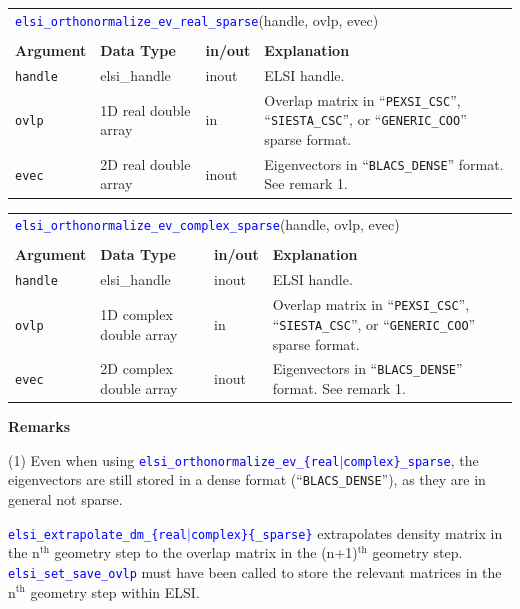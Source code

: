 \documentclass{report}
\newcommand{\api}[1]{\textcolor{blue}{\texttt{#1}}}
\begin{document}
\begin{tabular}[]{|p{20mm}|p{40mm}|p{10mm}|p{92mm}|}
\multicolumn{4}{l}{\api{elsi\_orthonormalize\_ev\_real\_sparse}(handle, ovlp, evec)}\\
\multicolumn{4}{l}{}\\
\hline
\multicolumn{1}{|l|}{\textbf{Argument}} & \multicolumn{1}{l|}{\textbf{Data Type}} & \multicolumn{1}{l|}{\textbf{in/out}} & \multicolumn{1}{l|}{\textbf{Explanation}}\\
\hline
\texttt{handle} & elsi\_handle         & inout & ELSI handle.\\
\hline
\texttt{ovlp}   & 1D real double array & in    & Overlap matrix in ``\texttt{PEXSI\_CSC}'', ``\texttt{SIESTA\_CSC}'', or ``\texttt{GENERIC\_COO}'' sparse format.\\
\hline
\texttt{evec}   & 2D real double array & inout & Eigenvectors in ``\texttt{BLACS\_DENSE}'' format. See remark 1.\\
\hline
\end{tabular}

\begin{tabular}[]{|p{20mm}|p{40mm}|p{10mm}|p{92mm}|}
\multicolumn{4}{l}{\api{elsi\_orthonormalize\_ev\_complex\_sparse}(handle, ovlp, evec)}\\
\multicolumn{4}{l}{}\\
\hline
\multicolumn{1}{|l|}{\textbf{Argument}} & \multicolumn{1}{l|}{\textbf{Data Type}} & \multicolumn{1}{l|}{\textbf{in/out}} & \multicolumn{1}{l|}{\textbf{Explanation}}\\
\hline
\texttt{handle} & elsi\_handle            & inout & ELSI handle.\\
\hline
\texttt{ovlp}   & 1D complex double array & in    & Overlap matrix in ``\texttt{PEXSI\_CSC}'', ``\texttt{SIESTA\_CSC}'', or ``\texttt{GENERIC\_COO}'' sparse format.\\
\hline
\texttt{evec}   & 2D complex double array & inout & Eigenvectors in ``\texttt{BLACS\_DENSE}'' format. See remark 1.\\
\hline
\end{tabular}

\textbf{Remarks}

(1) Even when using \api{elsi\_orthonormalize\_ev\_\{real$\vert$complex\}\_sparse}, the eigenvectors are still stored in a dense format (``\texttt{BLACS\_DENSE}''), as they are in general not sparse.

\api{elsi\_extrapolate\_dm\_\{real$\vert$complex\}\{\_sparse\}} extrapolates density matrix in the n$^\text{th}$ geometry step to the overlap matrix in the (n+1)$^\text{th}$ geometry step. \api{elsi\_set\_save\_ovlp} must have been called to store the relevant matrices in the n$^\text{th}$ geometry step within ELSI.
\end{document}
